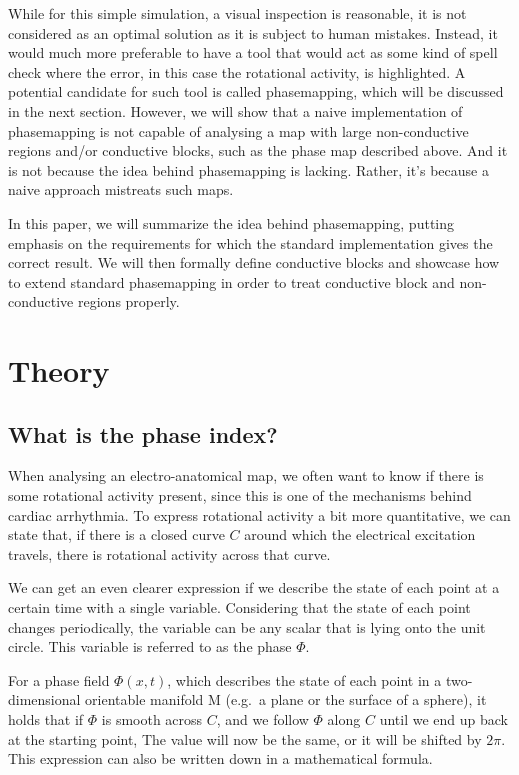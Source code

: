 \documentclass[twocolumn]{article}
\begin{document}
While for this simple simulation, a visual inspection is reasonable, it
is not considered as an optimal solution as it is subject to human
mistakes. Instead, it would much more preferable to have a tool that
would act as some kind of spell check where the error, in this case the
rotational activity, is highlighted.
A potential candidate for such tool is called phasemapping, which will
be discussed in the next section. However, we will show that a naive
implementation of phasemapping is not capable of analysing a map with
large non-conductive regions and/or conductive blocks, such as the phase
map described above. And it is not because the idea behind phasemapping
is lacking. Rather, it's because a naive approach mistreats such maps.

In this paper, we will summarize the idea behind phasemapping, putting
emphasis on the requirements for which the standard implementation gives
the correct result. We will then formally define conductive blocks and
showcase how to extend standard phasemapping in order to treat
conductive block and non-conductive regions properly.

\section{Theory}\label{theory}

\subsection{What is the phase index?}\label{what-is-the-phase-index}

When analysing an electro-anatomical map, we often want to know if there
is some rotational activity present, since this is one of the mechanisms
behind cardiac arrhythmia. To express rotational activity a bit more
quantitative, we can state that, if there is a closed curve \(C\) around
which the electrical excitation travels, there is rotational activity
across that curve.

We can get an even clearer expression if we describe the state of each
point at a certain time with a single variable. Considering that the
state of each point changes periodically, the variable can be any scalar
that is lying onto the unit circle. This variable is referred to as the
phase \(\Phi\).

For a phase field \(\Phi(x, t)\), which describes the state of each
point in a two-dimensional orientable manifold M (e.g.~a plane or the
surface of a sphere), it holds that if \(\Phi\) is smooth across \(C\),
and we follow \(\Phi\) along \(C\) until we end up back at the starting
point, The value will now be the same, or it will be shifted by
\(2\pi\). This expression can also be written down in a mathematical
formula.
\end{document}
